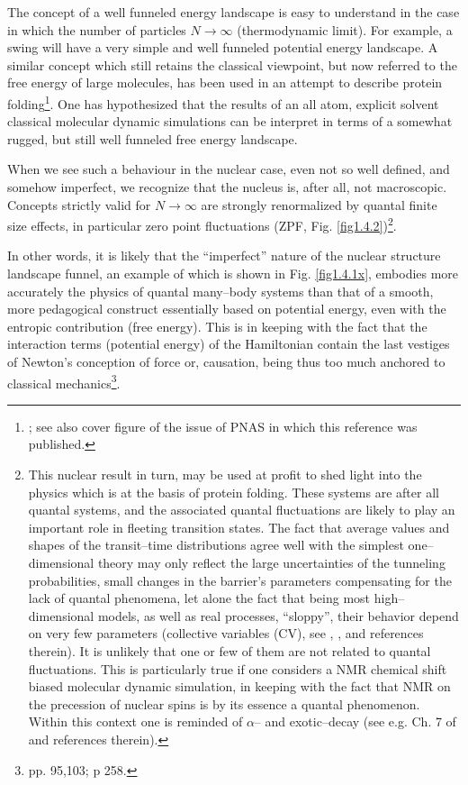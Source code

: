  The concept of a well funneled energy landscape  is easy to understand in the case in which the number of particles $N\rightarrow \infty$ (thermodynamic limit). For example, a swing will have a very simple and well funneled potential energy landscape. A similar concept which still retains the classical viewpoint, but now referred to the free energy of large molecules, has been used in an attempt to describe protein folding\footnote{\cite{Wolynes:16,Wolynes:12}; see also cover figure of the issue of PNAS in which this reference was published.}. One has hypothesized that the results of an all atom, explicit solvent classical molecular dynamic simulations can be interpret in terms of a somewhat rugged, but still well funneled free energy landscape.

When we see such a behaviour in the nuclear case, even not so well defined, and somehow imperfect, we recognize that the nucleus is, after all, not macroscopic. Concepts strictly valid for $N\rightarrow\infty$ are strongly renormalized by quantal finite size effects, in particular zero point fluctuations (ZPF, Fig. \ref{fig1.4.2})\footnote{This nuclear result in turn, may be used at profit to shed light into the physics which is at the basis of protein folding. These systems are after all quantal systems, and the associated quantal fluctuations are likely to play an important role in fleeting transition states. The fact that average values and shapes of the transit--time distributions agree well with the simplest one--dimensional theory may only reflect the large uncertainties of the tunneling probabilities, small changes in the barrier's parameters compensating for the lack of quantal phenomena, let alone the fact that being most high--dimensional models, as well as real processes, ``sloppy'', their behavior depend on very few parameters (collective variables (CV), see \cite{Buchanan:15}, \cite{Transtrum:15}, and references therein). It is unlikely that one or few of them are not  related to quantal fluctuations. This is particularly true if one considers a NMR chemical shift biased molecular dynamic simulation, in keeping with the fact that NMR on the precession of nuclear spins is by its essence a quantal phenomenon. Within this context one is reminded of $\alpha$-- and exotic--decay (see e.g. Ch. 7 of \cite{Brink:05} and references therein).}.

In other words, it is likely that the ``imperfect'' nature of the nuclear structure landscape funnel, an example of which is shown in Fig. \ref{fig1.4.1x}, embodies more accurately the physics of quantal many--body systems than that of a smooth, more pedagogical construct essentially based on potential energy, even with the entropic contribution (free energy). This is in keeping with the fact that the interaction terms (potential energy) of the Hamiltonian contain the last vestiges of Newton's conception of force or, causation, being thus too much anchored to classical mechanics\footnote{\cite{Born:48} pp. 95,103; \cite{Pais:86} p 258.}.

